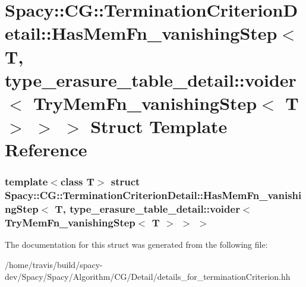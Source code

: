 \hypertarget{structSpacy_1_1CG_1_1TerminationCriterionDetail_1_1HasMemFn__vanishingStep_3_01T_00_01type__erase68bf58e6fe8801ea623c3e61fec58b3}{\section{\-Spacy\-:\-:\-C\-G\-:\-:\-Termination\-Criterion\-Detail\-:\-:\-Has\-Mem\-Fn\-\_\-vanishing\-Step$<$ \-T, type\-\_\-erasure\-\_\-table\-\_\-detail\-:\-:voider$<$ \-Try\-Mem\-Fn\-\_\-vanishing\-Step$<$ \-T $>$ $>$ $>$ \-Struct \-Template \-Reference}
\label{structSpacy_1_1CG_1_1TerminationCriterionDetail_1_1HasMemFn__vanishingStep_3_01T_00_01type__erase68bf58e6fe8801ea623c3e61fec58b3}
}
\subsubsection*{template$<$class T$>$ struct Spacy\-::\-C\-G\-::\-Termination\-Criterion\-Detail\-::\-Has\-Mem\-Fn\-\_\-vanishing\-Step$<$ T, type\-\_\-erasure\-\_\-table\-\_\-detail\-::voider$<$ Try\-Mem\-Fn\-\_\-vanishing\-Step$<$ T $>$ $>$ $>$}



\-The documentation for this struct was generated from the following file\-:\begin{DoxyCompactItemize}
\item 
/home/travis/build/spacy-\/dev/\-Spacy/\-Spacy/\-Algorithm/\-C\-G/\-Detail/details\-\_\-for\-\_\-termination\-Criterion.\-hh\end{DoxyCompactItemize}
